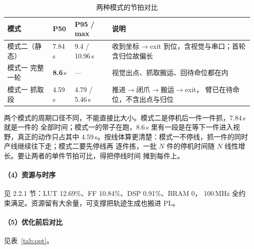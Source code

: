 \documentclass[UTF8,a4paper,zihao=5,fontset=windows]{ctexart}
\begin{document}
\begin{table}[H]\centering\small
\caption{两种模式的节拍对比}
\begin{tabularx}{\linewidth}{@{}p{2.4cm}p{2.6cm}p{2.6cm}X@{}}
\toprule
模式 & P50 & P95 / max & 说明 \\
\midrule
模式二（静态） & 7.84\,s & 9.4 / 10.96\,s & 收到坐标$\rightarrow$exit 到位，含视觉与串口；首轮含归位故偏长 \\
模式一 完整一轮 & \textbf{8.6}\,s & --- & 视觉出点、抓取搬运、回待命位都在内 \\
模式一 抓取段 & 4.59\,s & 4.79 / 5.46\,s & 推进$\rightarrow$闭爪$\rightarrow$搬运$\rightarrow$exit，
臂已在待命位，不含出点与归位 \\
\bottomrule
\end{tabularx}
\end{table}

两个模式的周期口径不同，不能直接比大小。模式二是停机后一件一件抓，7.84\,s 就是一件的
全部时间；模式一的带子在跑，8.6\,s 里有一段是在等下一件进入视野，真正的动作只占其中
4.59\,s。按线体算更清楚：模式一不停线，抓一件的同时产线继续往下走；模式二要先停线再
逐件拣，一批 $N$ 件的停机时间随 $N$ 线性增长。要让两者的单件节拍可比，得把停线时间
摊到每件上。

\paragraph{（4）资源与时序} 见 2.2.1 节：LUT 12.69\%、FF 10.84\%、DSP 0.91\%、BRAM 0，
100\,MHz 全约束满足。资源留有大余量，可支撑把轨迹生成也搬进 PL。

\paragraph{（5）优化前后对比} 见表~\ref{tab:opt}。
\end{document}
